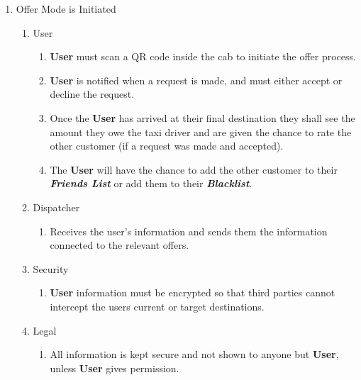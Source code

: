 \documentclass[english]{article}
\begin{document}
\begin{enumerate}[{BE}1.]
	\item Offer	Mode is Initiated	
	\begin{enumerate}[{VP5}.1]
		\item User
			\begin{enumerate}
				\item \textbf{User} must scan a QR code inside the cab to initiate the offer process.
				\item \textbf{User} is notified when a request is made, and must either accept or decline the request.
				\item Once the \textbf{User} has arrived at their final destination they shall see the amount they owe the taxi driver and are given the chance to rate the other customer (if a request was made and accepted).
				\item The \textbf{User} will have the chance to add the other customer to their \textbf{\emph{Friends List}} or add them to their \textbf{\emph{Blacklist}}.
			\end{enumerate}
		\item Dispatcher
			\begin{enumerate}
				\item Receives the user's information and sends them the information connected to the relevant offers.
			\end{enumerate}
		\item Security
			\begin{enumerate}
				\item \textbf{User} information must be encrypted so that third parties cannot intercept the users current or target destinations.
			\end{enumerate}
		\item Legal
			\begin{enumerate}
				\item All information is kept secure and not shown to anyone but \textbf{User}, unless \textbf{User} gives permission.
			\end{enumerate}
	\end{enumerate}


\end{enumerate}
\end{document}
